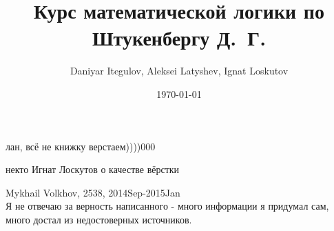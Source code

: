 \documentclass[a4paper, fleqn, draft]{article}
\author{Daniyar Itegulov, Aleksei Latyshev, Ignat Loskutov}
\date{\today}
\title{Курс математической логики по Штукенбергу Д.~Г.}
\newcommand{\+}{\lambda}
\begin{document}
\theoremstyle{definition}
\newtheorem*{definition}{Определение}%
\newtheorem*{example}{Пример}
\newtheorem{theorem}{Теорема}[section]
\newtheorem{axiom}{Аксиома}[section]
\newtheorem{lemma}[theorem]{Лемма}

\maketitle
\setcounter{tocdepth}{2}
\tableofcontents

\epigraph{%
    лан, всё не книжку верстаем))))000}
  {некто Игнат Лоскутов о качестве вёрстки}

Mykhail Volkhov, 2538, 2014Sep-2015Jan\\
Я не отвечаю за верность написанного - много информации
я придумал сам, много достал из недостоверных источников.














%

%
%
\end{document}
